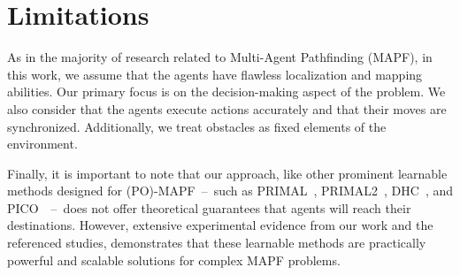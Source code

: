 \documentclass{article} %
\begin{document}

\section*{Limitations}

As in the majority of research related to Multi-Agent Pathfinding (MAPF), in this work, we assume that the agents have flawless localization and mapping abilities. Our primary focus is on the decision-making aspect of the problem. We also consider that the agents execute actions accurately and that their moves are synchronized. Additionally, we treat obstacles as fixed elements of the environment.

Finally, it is important to note that our approach, like other prominent learnable methods designed for (PO)-MAPF~--~such as PRIMAL~\citep{sartoretti2019primal}, PRIMAL2~\citep{damani2021primal}, DHC~\citep{ma2021distributed}, and PICO~\citep{Li2022MultiAgentPF}~--~does not offer theoretical guarantees that agents will reach their destinations. However, extensive experimental evidence from our work and the referenced studies, demonstrates that these learnable methods are practically powerful and scalable solutions for complex MAPF problems.




%






\newpage
\end{document}
